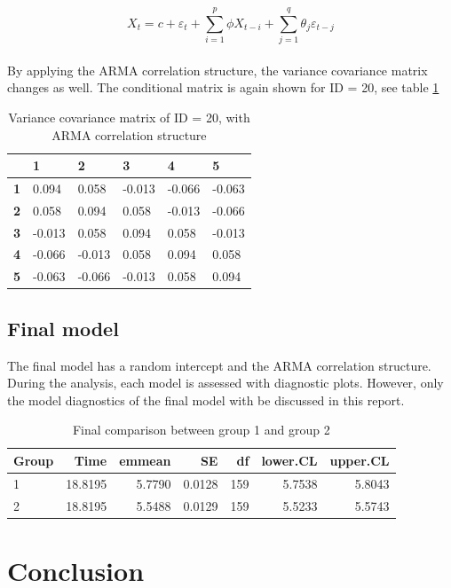 \documentclass{article}
\begin{document}
\begin{equation}\label{eq:arma}
    X_t = c + \varepsilon_t + \sum_{i=1}^p \phi X_{t-i} + \sum_{j=1}^q \theta_j\varepsilon_{t-j}
\end{equation}


\paragraph{}
By applying the ARMA correlation structure, the variance covariance matrix changes as well. The conditional matrix is again shown for ID = 20, see table \ref{tab:covar_arma}

\begin{table}[h]
\centering
\caption{Variance covariance matrix of ID = 20, with ARMA correlation structure}
\begin{tabular}{l|lllll}
\hline 
           & \textbf{1} & \textbf{2} & \textbf{3} & \textbf{4} & \textbf{5} \\
           \hline
\textbf{1} & 0.094      & 0.058      & -0.013     & -0.066     & -0.063     \\
\textbf{2} & 0.058      & 0.094      & 0.058      & -0.013     & -0.066     \\
\textbf{3} & -0.013     & 0.058      & 0.094      & 0.058      & -0.013     \\
\textbf{4} & -0.066     & -0.013     & 0.058      & 0.094      & 0.058      \\
\textbf{5} & -0.063     & -0.066     & -0.013     & 0.058      & 0.094    \\
\hline
\end{tabular}
\label{tab:covar_arma}
\end{table}

\subsection{Final model}
The final model has a random intercept and the ARMA correlation structure. During the analysis, each model is assessed with diagnostic plots. However, only the model diagnostics of the final model with be discussed in this report.




\begin{table}[ht]
\centering
\caption{Final comparison between group 1 and group 2}
\begin{tabular}{lrrrrrr}
  \hline
Group & Time & emmean & SE & df & lower.CL & upper.CL \\ 
  \hline
1 & 18.8195 & 5.7790 & 0.0128 & 159 & 5.7538 & 5.8043 \\ 
  2 & 18.8195 & 5.5488 & 0.0129 & 159 & 5.5233 & 5.5743 \\ 
   \hline
\end{tabular}
\label{tab:final_result}
\end{table}



\section{Conclusion}
\end{document}
